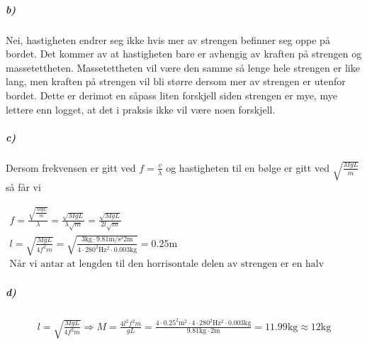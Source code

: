 \documentclass[11pt, A4paper,norsk]{article}
\begin{document}
			\subparagraph{b)}
				\begin{flushleft}
Nei, hastigheten endrer seg ikke hvis mer av strengen befinner seg oppe på bordet. Det kommer av at hastigheten bare er avhengig av kraften på strengen og massetettheten. Massetettheten vil være den samme så lenge hele strengen er like lang, men kraften på strengen vil bli større dersom mer av strengen er utenfor bordet. Dette er derimot en såpass liten forskjell siden strengen er mye, mye lettere enn logget, at det i praksis ikke vil være noen forskjell.
				\end{flushleft}








			\subparagraph{c)}
				\begin{flushleft}
Dersom frekvensen er gitt ved $f = \frac{v}{\lambda}$ og hastigheten til en bølge er gitt ved $\sqrt{\frac{MgL}{m}}$ så får vi
				\end{flushleft}
				\begin{gather*}
f = \frac{\sqrt{\frac{MgL}{m}}}{\lambda} = \frac{\sqrt{MgL}}{\lambda \sqrt{m}} = \frac{\sqrt{MgL}}{2 l \sqrt{m}} \\
l = \sqrt{\frac{M g L}{4 f^2 m}} = \sqrt{\frac{3\text{kg} \cdot 9.81\text{m/s$^2$} 2\text{m}}{4 \cdot 280^2\text{Hz$^2$} \cdot 0.003\text{kg}}} = 0.25\text{m} \\
\text{Når vi antar at lengden til den horrisontale delen av strengen er en halv bølgelengde.}
				\end{gather*}








			\subparagraph{d)}
				\begin{gather*}
l = \sqrt{\frac{MgL}{4f^2m}} \Rightarrow M = \frac{4 l^2 f^2 m}{g L} = \frac{4 \cdot 0.25^2\text{m$^2$} \cdot 4 \cdot 280^2\text{Hz$^2$} \cdot 0.003 \text{kg}}{9.81\text{kg} \cdot 2\text{m}} = 11.99\text{kg} \approx 12\text{kg}
				\end{gather*}
\end{document}
